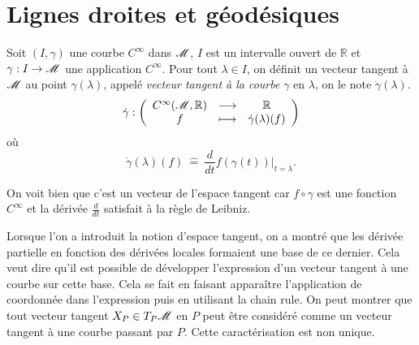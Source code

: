 \documentclass[a4paper,11pt]{report}
\begin{document}
        \section{Lignes droites et géodésiques}
        
            \begin{defn}
                Soit $(I,\gamma)$ une courbe $C^\infty$ dans $\mathscr{M}$, $I$ est  un intervalle ouvert de $\mathbb{R}$ et $\gamma:I\to\mathscr{M}$ une application $C^\infty$. Pour tout $\lambda\in I$, on définit un vecteur tangent à $\mathscr{M}$ au point $\gamma(\lambda)$, appelé \textit{vecteur tangent à la courbe} $\gamma$ en $\lambda$, on le note $\dot{\gamma}(\lambda)$.
                \begin{equation}
                    \dot{\gamma}:\left(
                    \begin{array}{ccc}
                        C^\infty(\mathscr{M},\mathbb{R}) & \longrightarrow & \mathbb{R} \\
                        f & \longmapsto & \dot{\gamma}(\lambda)(f)
                    \end{array}
                    \right)
                    \end{equation}
                    où
                    \begin{equation}
                         \dot{\gamma}(\lambda)(f) ~\hat{=}~ \frac{d}{dt}f(\gamma(t))|_{t=\lambda}.
                    \end{equation}
            \end{defn}
            
            On voit bien que c'est un vecteur de l'espace tangent car $f\circ\gamma$ est une fonction $C^\infty$ et la dérivée $\frac{d}{dt}$ satisfait à la règle de Leibniz.
            
            \begin{rmk}
                Lorsque l'on a introduit la notion d'espace tangent, on a montré que les dérivée partielle en fonction des dérivées locales formaient une base de ce dernier. Cela veut dire qu'il est possible de développer l'expression d'un vecteur tangent à une courbe sur cette base. Cela se fait en faisant apparaître l'application de coordonnée dans l'expression puis en utilisant la chain rule. On peut montrer que tout vecteur tangent $X_P\in T_P\mathscr{M}$ en $P$ peut être considéré comme un vecteur tangent à une courbe passant par $P$. Cette caractérisation est non unique.
            \end{rmk}
            
\end{document}
